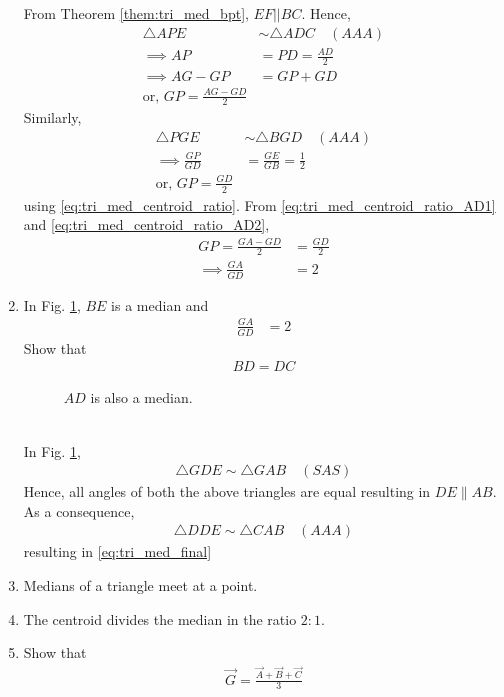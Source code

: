 \begin{enumerate}[label=\arabic*.,ref=\thesubsection.\theenumi]
\solution  From Theorem \ref{them:tri_med_bpt}, $ EF || BC$.  Hence,
%
\begin{align}
\triangle APE &\sim \triangle ADC \quad (AAA)
\\
\implies AP &= PD = \frac{AD}{2}
\\
\implies  AG - GP &= GP + GD 
\\
\text{or, }  GP=\frac{AG - GD}{2} 
\label{eq:tri_med_centroid_ratio_AD1}
\end{align}
%
Similarly, 
%
\begin{align}
\triangle PGE &\sim \triangle BGD  \quad (AAA)
\\
\implies \frac{GP}{GD} &= \frac{GE}{GB} = \frac{1}{2}
\\
\text{or, }  GP=\frac{GD}{2} 
\label{eq:tri_med_centroid_ratio_AD2}
\end{align}
using \eqref{eq:tri_med_centroid_ratio}. From \eqref{eq:tri_med_centroid_ratio_AD1}
and \eqref{eq:tri_med_centroid_ratio_AD2},
%
\begin{align}
GP=\frac{GA - GD}{2} &=\frac{GD}{2}  
\\
\implies  \frac{GA}{GD} &=2
\end{align}
\item In Fig. 	\ref{fig:tri_med_meet_proof}, $BE$ is a median and 
%
\begin{align}
\frac{GA}{GD} &=2
\end{align}
%
Show that
%
\begin{align}
\label{eq:tri_med_final}
BD = DC
\end{align}
%
\begin{figure}[!ht]
	\begin{center}
		\resizebox{\columnwidth}{!}{}
	\end{center}
	\caption{$AD$ is also a median. }
	\label{fig:tri_med_meet_proof}	
\end{figure}
%
\\
\solution 	In Fig. \ref{fig:tri_med_meet_proof},
%
\begin{align}
\triangle GDE \sim \triangle GAB \quad (SAS)
\end{align}
%
Hence, all angles of both the above triangles are equal resulting in $DE\parallel AB$. As a consequence, 
%
\begin{align}
\triangle DDE \sim \triangle CAB \quad (AAA)
\end{align}
%
resulting in \eqref{eq:tri_med_final}

\item Medians of a triangle meet at a point.
\label{them:tri_med_meet}
\item The centroid divides the median in the ratio $2:1$.
\label{them:tri_med_ratio}
%
\item Show that 
%
\begin{align}
\vec{G} = \frac{\vec{A}+\vec{B}+\vec{C}}{3}
\end{align}
\end{enumerate}
